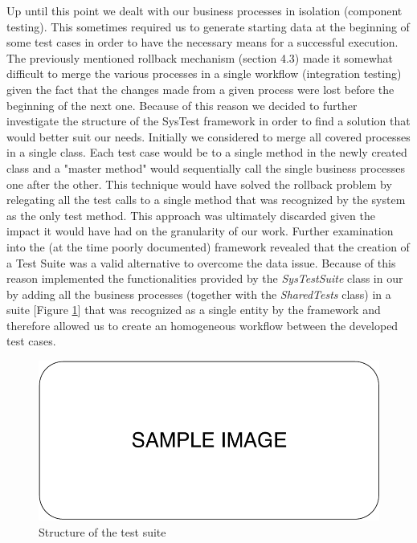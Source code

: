 Up until this point we dealt with our business processes in isolation (component testing). This sometimes required us to generate starting data at the beginning of some test cases in order to have the necessary means for a successful execution. The previously mentioned rollback mechanism (section 4.3) made it somewhat difficult to merge the various processes in a single workflow (integration testing) given the fact that the changes made from a given process were lost before the beginning of the next one. Because of this reason we decided to further investigate the structure of the SysTest framework in order to find a solution that would better suit our needs. Initially we considered to merge all covered processes in a single class. Each test case would be to a single method in the newly created class and a "master method" would sequentially call the single business processes one after the other. This technique would have solved the rollback problem by relegating all the test calls to a single method that was recognized by the system as the only test method. This approach was ultimately discarded given the impact it would have had on the granularity of our work. Further examination into the (at the time poorly documented) framework revealed that the creation of a Test Suite was a valid alternative to overcome the data issue. Because of this reason implemented the functionalities provided by the \textit{SysTestSuite} class in our by adding all the business processes (together with the \textit{SharedTests} class) in a suite [Figure \ref{fig:syTestSuite}] that was recognized as a single entity by the framework and therefore allowed us to create an homogeneous workflow between the developed test cases.

\begin{figure}[ht]
	\centering
	\includegraphics[scale=0.7]{Images/SampleImage.pdf}
	\caption{Structure of the test suite}
	\label{fig:syTestSuite}
\end{figure}

